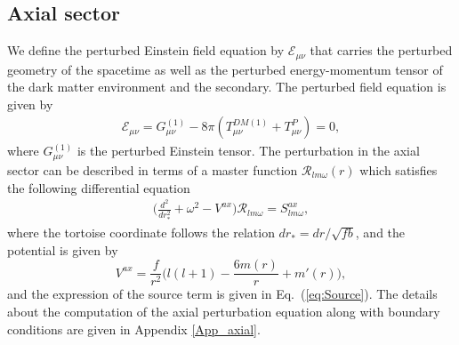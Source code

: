 \documentclass[11pt]{article}
\begin{document}
\subsection{Axial sector}\label{ax1}
We define the perturbed Einstein field equation by $\mathcal{E}_{\mu\nu}$ that carries the perturbed geometry of the spacetime as well as the perturbed energy-momentum tensor of the dark matter environment and the secondary. 
The perturbed field equation is given by
\begin{align}
    \mathcal{E}_{\mu\nu} = G^{(1)}_{\mu\nu} - 8\pi (T_{\mu\nu}^{DM (1)}+T^{P}_{\mu\nu})=0,
\end{align}
where $G^{(1)}_{\mu\nu}$ is the perturbed Einstein tensor. The perturbation in the axial sector can be described in terms of a master function $\mathcal{R}_{lm\omega}(r)$ which satisfies the following differential equation 
\begin{align}
    \Big(\frac{d^{2}}{dr_{*}^{2}}+\omega^{2}-V^{ax}\Big)\mathcal{R}_{lm\omega} = S^{ax}_{lm\omega}, \label{eq:master_axial}
\end{align}
where the tortoise coordinate follows the relation $dr_{*}=dr/\sqrt{fb}$, and the potential is given by
\begin{equation}
V^{ax} = \dfrac{f}{r^2}\Big(l(l+1) - \dfrac{6m(r)}{r} + m'(r)  \Big),
\end{equation}
and the expression of the source term is given in Eq.~(\ref{eq:Source}). The details about the computation of the axial perturbation equation along with boundary conditions are given in Appendix \ref{App_axial}.
\end{document}
